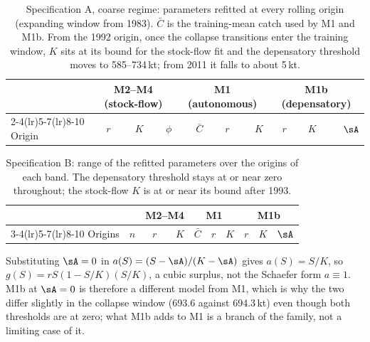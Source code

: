 \begin{table}[!htb]
\centering\scriptsize
\setlength{\tabcolsep}{4pt}
\caption{Specification A, coarse regime: parameters refitted at every rolling origin (expanding window from 1983). $\bar C$ is the training-mean catch used by M1 and M1b. From the 1992 origin, once the collapse transitions enter the training window, $K$ sits at its bound for the stock-flow fit and the depensatory threshold moves to 585--734\,kt; from 2011 it falls to about 5\,kt.}
\label{tab:si_rollingA}
\begin{tabular}{@{}lrrrrrrrrr@{}}
\toprule
 & \multicolumn{3}{c}{M2--M4 (stock-flow)} & \multicolumn{3}{c}{M1 (autonomous)} & \multicolumn{3}{c}{M1b (depensatory)} \\
\cmidrule(lr){2-4}\cmidrule(lr){5-7}\cmidrule(lr){8-10}
Origin & $r$ & $K$ & $\phi$ & $\bar C$ & $r$ & $K$ & $r$ & $K$ & $\sA$ \\
\midrule

\bottomrule
\end{tabular}
\end{table}

\begin{table}[!htb]
\centering\scriptsize
\setlength{\tabcolsep}{4pt}
\caption{Specification B: range of the refitted parameters over the origins of each band. The depensatory threshold stays at or near zero throughout; the stock-flow $K$ is at or near its bound after 1993.}
\label{tab:si_rollingB}
\scriptsize\setlength{\tabcolsep}{2.5pt}
\begin{tabular}{@{}lrrrrrrrrr@{}}
\toprule
 & & \multicolumn{2}{c}{M2--M4} & \multicolumn{3}{c}{M1} & \multicolumn{3}{c}{M1b} \\
\cmidrule(lr){3-4}\cmidrule(lr){5-7}\cmidrule(lr){8-10}
Origins & $n$ & $r$ & $K$ & $\bar C$ & $r$ & $K$ & $r$ & $K$ & $\sA$ \\
\midrule

\bottomrule
\end{tabular}
\end{table}

\begin{remark}
Substituting $\sA = 0$ in $a(S) = (S-\sA)/(K-\sA)$ gives $a(S) = S/K$, so $g(S) = rS(1-S/K)(S/K)$, a cubic surplus, not the Schaefer form $a\equiv 1$. M1b at $\sA = 0$ is therefore a different model from M1, which is why the two differ slightly in the collapse window (693.6 against 694.3\,kt) even though both thresholds are at zero; what M1b adds to M1 is a branch of the family, not a limiting case of it.
\end{remark}

